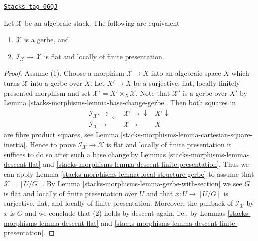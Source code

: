 \begin{proposition}
\label{stacks-morphisms-proposition-when-gerbe}
\href{https://stacks.math.columbia.edu/tag/06QJ}{\texttt{Stacks tag 06QJ}}

Let $\mathcal{X}$ be an algebraic stack. The following are equivalent
\begin{enumerate}
\item $\mathcal{X}$ is a gerbe, and
\item $\mathcal{I}_\mathcal{X} \to \mathcal{X}$ is flat and locally of
finite presentation.
\end{enumerate}
\end{proposition}

\begin{proof}
Assume (1). Choose a morphism $\mathcal{X} \to X$ into an algebraic space $X$
which turns $\mathcal{X}$ into a gerbe over $X$. Let $X' \to X$ be a
surjective, flat, locally finitely presented morphism and
set $\mathcal{X}' = X' \times_X \mathcal{X}$. Note that $\mathcal{X}'$
is a gerbe over $X'$ by
Lemma \ref{stacks-morphisms-lemma-base-change-gerbe}.
Then both squares in
$$
\begin{array}{ccc}\mathcal{I}_{\mathcal{X}'} \longrightarrow\downarrow & \mathcal{X}' \longrightarrow\downarrow & X' \downarrow \\ \mathcal{I}_\mathcal{X} \longrightarrow & \mathcal{X} \longrightarrow & X\end{array}
$$
are fibre product squares, see
Lemma \ref{stacks-morphisms-lemma-cartesian-square-inertia}.
Hence to prove $\mathcal{I}_\mathcal{X} \to \mathcal{X}$ is flat and
locally of finite presentation it suffices to do so after such a base
change by
Lemmas \ref{stacks-morphisms-lemma-descent-flat} and
\ref{stacks-morphisms-lemma-descent-finite-presentation}.
Thus we can apply
Lemma \ref{stacks-morphisms-lemma-local-structure-gerbe}
to assume that $\mathcal{X} = [U/G]$.
By
Lemma \ref{stacks-morphisms-lemma-gerbe-with-section}
we see $G$ is flat and locally of finite presentation over $U$ and
that $x : U \to [U/G]$ is surjective, flat, and locally of finite
presentation. Moreover, the pullback of $\mathcal{I}_\mathcal{X}$
by $x$ is $G$ and we conclude that (2) holds by descent again, i.e., by
Lemmas \ref{stacks-morphisms-lemma-descent-flat} and
\ref{stacks-morphisms-lemma-descent-finite-presentation}.


\end{proof}
